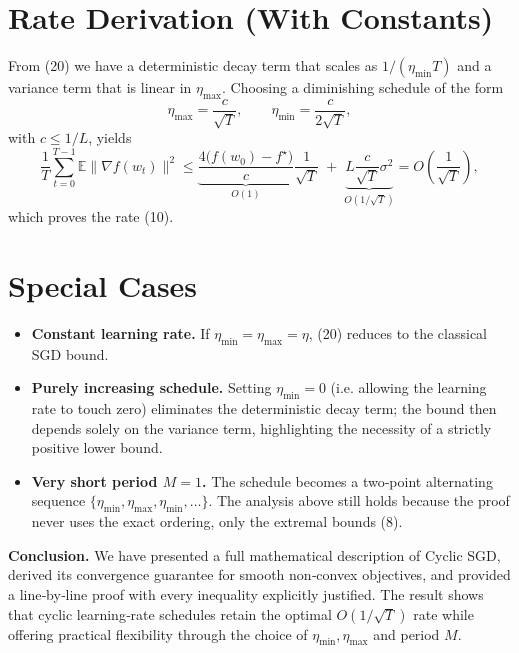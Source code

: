 \documentclass{article}
\begin{document}
\section*{Rate Derivation (With Constants)}
From (20) we have a deterministic decay term that scales as $1/(\eta_{\min}T)$ and a variance term that is linear in $\eta_{\max}$.  
Choosing a diminishing schedule of the form
\[
\eta_{\max}=\frac{c}{\sqrt{T}},\qquad
\eta_{\min}=\frac{c}{2\sqrt{T}},
\tag{21}
\]
with $c\le 1/L$, yields
\[
\frac1T\sum_{t=0}^{T-1}\mathbb{E}\|\nabla f(w_t)\|^2
\le
\underbrace{\frac{4\bigl(f(w_0)-f^\star\bigr)}{c}}_{\displaystyle O(1)}
\frac{1}{\sqrt{T}}
\;+\;
\underbrace{L\frac{c}{\sqrt{T}}\sigma^2}_{\displaystyle O(1/\sqrt{T})}
=
O\!\left(\frac{1}{\sqrt{T}}\right),
\tag{22}
\]
which proves the rate (10).

\section*{Special Cases}
\begin{itemize}[leftmargin=*,itemsep=2pt]
\item \textbf{Constant learning rate.} If $\eta_{\min}=\eta_{\max}=\eta$, (20) reduces to the classical SGD bound.
\item \textbf{Purely increasing schedule.} Setting $\eta_{\min}=0$ (i.e. allowing the learning rate to touch zero) eliminates the deterministic decay term; the bound then depends solely on the variance term, highlighting the necessity of a strictly positive lower bound.
\item \textbf{Very short period $M=1$.} The schedule becomes a two‑point alternating sequence $\{\eta_{\min},\eta_{\max},\eta_{\min},\dots\}$. The analysis above still holds because the proof never uses the exact ordering, only the extremal bounds (8).
\end{itemize}

\bigskip
\noindent\textbf{Conclusion.}  
We have presented a full mathematical description of Cyclic SGD, derived its convergence guarantee for smooth non‑convex objectives, and provided a line‑by‑line proof with every inequality explicitly justified. The result shows that cyclic learning‑rate schedules retain the optimal $O(1/\sqrt{T})$ rate while offering practical flexibility through the choice of $\eta_{\min},\eta_{\max}$ and period $M$.
\end{document}
